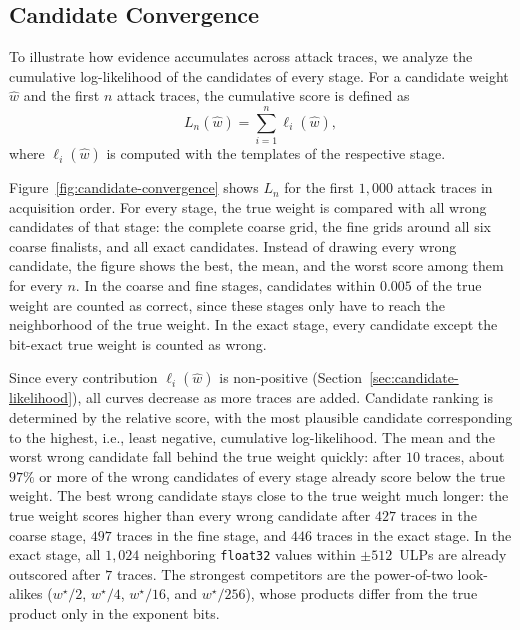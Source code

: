 \documentclass[conference]{IEEEtran}
\begin{document}
\subsection{Candidate Convergence}
\label{sec:candidate-convergence}

To illustrate how evidence accumulates across attack traces, we analyze the cumulative log-likelihood of the candidates of every stage.
For a candidate weight $\hat{w}$ and the first $n$ attack traces, the cumulative score is defined as
\begin{equation*}
	L_n(\hat{w})
	=
	\sum_{i=1}^{n}
	\ell_i(\hat{w}),
\end{equation*}
where $\ell_i(\hat{w})$ is computed with the templates of the respective stage.

Figure~\ref{fig:candidate-convergence} shows $L_n$ for the first $1{,}000$ attack traces in acquisition order.
For every stage, the true weight is compared with all wrong candidates of that stage: the complete coarse grid, the fine grids around all six coarse finalists, and all exact candidates.
Instead of drawing every wrong candidate, the figure shows the best, the mean, and the worst score among them for every $n$.
In the coarse and fine stages, candidates within $0.005$ of the true weight are counted as correct, since these stages only have to reach the neighborhood of the true weight.
In the exact stage, every candidate except the bit-exact true weight is counted as wrong.

Since every contribution $\ell_i(\hat{w})$ is non-positive (Section~\ref{sec:candidate-likelihood}), all curves decrease as more traces are added.
Candidate ranking is determined by the relative score, with the most plausible candidate corresponding to the highest, i.e., least negative, cumulative log-likelihood.
The mean and the worst wrong candidate fall behind the true weight quickly: after $10$ traces, about $97\%$ or more of the wrong candidates of every stage already score below the true weight.
The best wrong candidate stays close to the true weight much longer: the true weight scores higher than every wrong candidate after $427$ traces in the coarse stage, $497$ traces in the fine stage, and $446$ traces in the exact stage.
In the exact stage, all $1{,}024$ neighboring \texttt{float32} values within $\pm512$~ULPs are already outscored after $7$ traces.
The strongest competitors are the power-of-two look-alikes ($w^\star/2$, $w^\star/4$, $w^\star/16$, and $w^\star/256$), whose products differ from the true product only in the exponent bits.
\end{document}
